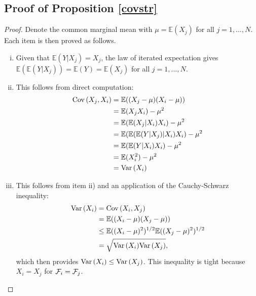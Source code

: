 \documentclass[11pt]{article}
\newcommand{\E}{\mathbb{E}}
\theoremstyle{definition}
\theoremstyle{definition}
\def\F{{\cal F}}
\def\E{{\mathbb E}}
\def\Var{{\rm Var}\,}
\def\Cov{{\rm Cov}\,}
\begin{document}
\subsection{Proof of Proposition \ref{covstr}}

\begin{proof} 
Denote the common marginal mean with $\mu = \E(X_j)$ for all $j = 1, \dots, N$. Each item is then proved as follows.
\begin{enumerate}[i)]
\item Given that $\E(Y | X_j)  = X_j$, the law of iterated expectation gives $\E(\E(Y | X_j))  = \E(Y) = \E(X_j)$ for all $j = 1, \dots, N$. 
\item This follows from direct computation:
\begin{align*}
\Cov(X_j, X_i) &= \E((X_j - \mu)(X_i - \mu))\\
&= \E(X_jX_i) - \mu^2\\
&= \E(\E(X_j|X_i)X_i) - \mu^2\\
&= \E(\E(\E(Y|X_j)|X_i)X_i) - \mu^2\\
&= \E(\E(Y|X_i)X_i) - \mu^2\\
&= \E(X_i^2) - \mu^2\\
&= \Var(X_i)
\end{align*}
\item This follows from item ii) and an application of the Cauchy-Schwarz inequality:
\begin{align*}
\Var(X_i) &= \Cov(X_i, X_j)\\
&= \E((X_i - \mu)(X_j - \mu))\\
&\leq \E((X_i - \mu)^2)^{1/2}\E((X_j - \mu)^2)^{1/2}\\
&= \sqrt{\Var(X_i) \Var(X_j)},
\end{align*}
which then provides $\Var(X_i) \leq \Var(X_j)$. This inequality is tight because $X_i = X_j$ for $\F_i = \F_j$. 

\end{enumerate}
\end{proof}
\end{document}
